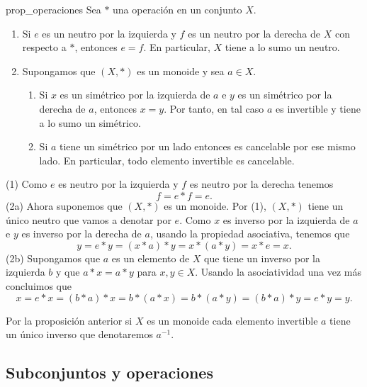 \begin{proposition}{}{prop_operaciones}
    Sea $*$ una operación en un conjunto $X$.

    \begin{enumerate}
    
    \item Si $e$ es un neutro por la izquierda y $f$ es un neutro por la derecha de $X$ con respecto a $*$, entonces $e = f$. En particular, $X$ tiene a lo sumo un neutro.
    
    \item Supongamos que $(X, *)$ es un monoide y sea $a \in X$.
    \begin{enumerate}
        \item Si $x$ es un simétrico por la izquierda de $a$ e $y$ es un simétrico por la derecha de $a$, entonces $x = y$. Por tanto, en tal caso $a$ es invertible y tiene a lo sumo un simétrico.
        
        \item Si $a$ tiene un simétrico por un lado entonces es cancelable por ese mismo lado. En particular, todo elemento invertible es cancelable.
    \end{enumerate}
    \end{enumerate}
\end{proposition}

\begin{proofbox}
    (1) Como $e$ es neutro por la izquierda y $f$ es neutro por la derecha tenemos
    \[
    f = e * f = e.
    \]
    (2a) Ahora suponemos que $(X, *)$ es un monoide. Por (1), $(X, *)$ tiene un único neutro que vamos a denotar por $e$. Como $x$ es inverso por la izquierda de $a$ e $y$ es inverso por la derecha de $a$, usando la propiedad asociativa, tenemos que
    \[
    y = e * y = (x * a) * y = x * (a * y) = x * e = x.
    \]
    (2b) Supongamos que $a$ es un elemento de $X$ que tiene un inverso por la izquierda $b$ y que $a * x = a * y$ para $x, y \in X$. Usando la asociatividad una vez más concluimos que
    \[
    x = e * x = (b * a) * x = b * (a * x) = b * (a * y) = (b * a) * y = e * y = y.
    \]
\end{proofbox}

\begin{remark}
    Por la proposición anterior si $X$ es un monoide cada elemento invertible $a$ tiene un único inverso que denotaremos $a^{-1}$. 
\end{remark}

\subsection{Subconjuntos y operaciones}

